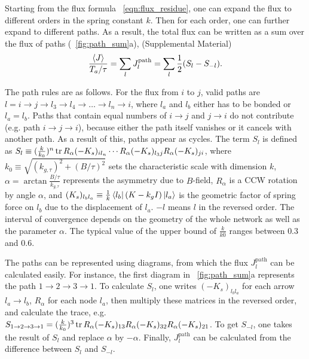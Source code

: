 \documentclass[
 preprint,
 preprintnumbers,
 amsmath,amssymb,
 aps,
 pre,
 longbibliography,
 10pt, twocolumn
]{revtex4-1}
\begin{document}
Starting from the flux formula \eqnname~\eqref{eqn:flux_residue}, one can expand the flux to different orders in the spring constant $k$. Then for each order, one can further expand to different paths.
As a result, the total flux can be written as a sum over the flux of paths (\figurename~\ref{fig:path_sum}a), (Supplemental Material)
\begin{equation} \label{eqn:flux_path}
    \frac{\expval{J}}{T_a/\tau} = \sum_l J^\text{path}_l = \sum_l \frac{1}{2}(S_l - S_{-l}).
\end{equation}

The path rules are as follows.
For the flux from $i$ to $j$, valid paths are $l=i\rightarrow j\rightarrow l_3\rightarrow l_4\rightarrow \dots \rightarrow l_n\rightarrow i$, where $l_a$ and $l_b$ either has to be bonded or $l_a=l_b$. Paths that contain equal numbers of $i\rightarrow j$ and $j\rightarrow i$ do not contribute (e.g. path $i\rightarrow j\rightarrow i$), because either the path itself vanishes or it cancels with another path. As a result of this, paths appear as cycles.
The term $S_l$ is defined as $S_l \equiv (\frac{k}{k_0})^n \tr R_\alpha (-K_s)_{i l_n} \cdots R_\alpha (-K_s)_{l_3j} R_\alpha (-K_s)_{ji}$,
where $k_0\equiv \sqrt{(k_{g,\tau})^2 + (B/\tau)^2}$ sets the characteristic scale with dimension $k$, $\alpha = \arctan{\frac{B/\tau}{k_{g,\tau}}}$ represents the asymmetry due to $B$-field, $R_\alpha$ is a CCW rotation by angle $\alpha$, and $(K_s)_{l_b l_a} \equiv \frac{1}{k}\bra{l_b}(K-k_gI)\ket{l_a}$ is the geometric factor of spring force on $l_b$ due to the displacement of $l_a$.
$-l$ means $l$ in the reversed order.
The interval of convergence depends on the geometry of the whole network as well as the parameter $\alpha$. The typical value of the upper bound of $\frac{k}{k0}$ ranges between $0.3$ and $0.6$.

The paths can be represented using diagrams, from which the flux $J^\text{path}_l$ can be calculated easily. For instance, the first diagram in \figurename~\ref{fig:path_sum}a represents the path $1\rightarrow 2\rightarrow 3\rightarrow 1$. To calculate $S_l$, one writes $(-K_s)_{l_bl_a}$ for each arrow $l_a\rightarrow l_b$, $R_\alpha$ for each node $l_a$, then multiply these matrices in the reversed order, and calculate the trace, e.g. $S_{1\rightarrow 2\rightarrow 3\rightarrow 1} = (\frac{k}{k_0})^3 \tr R_\alpha (-K_s)_{13} R_\alpha (-K_s)_{32} R_\alpha (-K_s)_{21}$. To get $S_{-l}$, one takes the result of $S_l$ and replace $\alpha$ by $-\alpha$. Finally, $J^\text{path}_l$ can be calculated from the difference between $S_l$ and $S_{-l}$.
\end{document}
